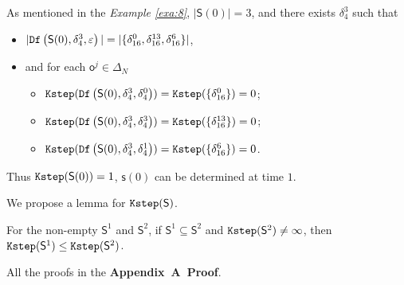 \begin{example}\label{exa:9}
As mentioned in the {\em Example \ref{exa:8}}, $|\mathsf{S}(0)|=3$, and there exists $\delta_{4}^3$ such that 
 \begin{itemize}
 \item  $|{\tt Df}\left(\mathsf{S}(0),\delta_{4}^3,\varepsilon\right)|=|\{\delta_{16}^0,\delta_{16}^{13},\delta_{16}^6\}|$,
 \item   and for each $\mathsf{o}^{j}\in \Delta_N$
  \begin{itemize}
  \item   ${\tt Kstep}({\tt Df}\left(\mathsf{S}(0),\delta_{4}^3,\delta_{4}^0\right))={\tt Kstep}(\{\delta_{16}^0\})=0$;
 \item  ${\tt Kstep}({\tt Df}\left(\mathsf{S}(0),\delta_{4}^3,\delta_{4}^3\right))={\tt Kstep}(\{\delta_{16}^{13}\})=0$;
  \item  ${\tt Kstep}({\tt Df}\left(\mathsf{S}(0),\delta_{4}^3,\delta_{4}^1\right))={\tt Kstep}(\{\delta_{16}^{6}\})=0$.
 \end{itemize}
 \end{itemize}
Thus ${\tt Kstep}(\mathsf{S}(0))=1$, $\mathsf{s}(0)$ can be determined at time $1$.
\end{example}  

We propose a lemma for ${\tt Kstep}(\mathsf{S})$.

\begin{lemma}
For the non-empty $\mathsf{S}^{1}$ and $\mathsf{S}^{2}$, if $\mathsf{S}^{1}\subseteq\mathsf{S}^{2}$ and ${\tt Kstep}(\mathsf{S}^{2})\ne\infty$, then ${\tt Kstep}(\mathsf{S}^{1})\le{\tt Kstep}(\mathsf{S}^{2})$.%
  \label{lemm:1}
\end{lemma}

All the proofs in the {\bf Appendix~A~Proof}. 

